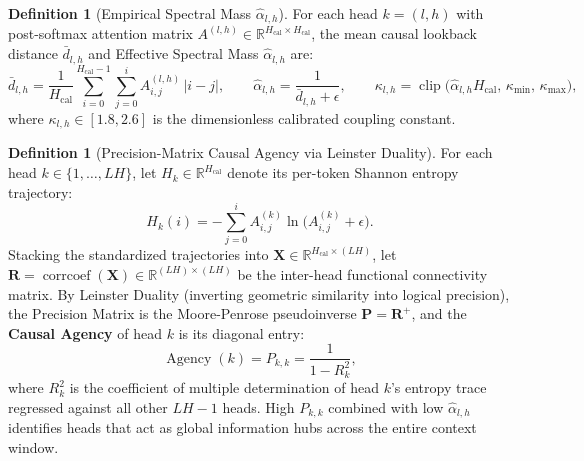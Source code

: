 \documentclass[11pt,letterpaper]{article}
\theoremstyle{definition}
\newtheorem{definition}[theorem]{Definition}
\begin{document}
\begin{definition}[Empirical Spectral Mass $\hat{\alpha}_{l,h}$]
For each head $k = (l, h)$ with post-softmax attention matrix $A^{(l,h)} \in \mathbb{R}^{H_{\text{cal}} \times H_{\text{cal}}}$, the mean causal lookback distance $\bar{d}_{l,h}$ and Effective Spectral Mass $\hat{\alpha}_{l,h}$ are:
\begin{equation}
    \bar{d}_{l,h} = \frac{1}{H_{\text{cal}}} \sum_{i=0}^{H_{\text{cal}}-1} \sum_{j=0}^{i} A^{(l,h)}_{i,j}\, |i - j|, \qquad \hat{\alpha}_{l,h} = \frac{1}{\bar{d}_{l,h} + \epsilon}, \qquad \kappa_{l,h} = \operatorname{clip}\!\big(\hat{\alpha}_{l,h} H_{\text{cal}},\, \kappa_{\min},\, \kappa_{\max}\big),
    \label{eq:eff_mass}
\end{equation}
where $\kappa_{l,h} \in [1.8, 2.6]$ is the dimensionless calibrated coupling constant.
\end{definition}

\begin{definition}[Precision-Matrix Causal Agency via Leinster Duality]
For each head $k \in \{1, \dots, L H\}$, let $H_k \in \mathbb{R}^{H_{\text{cal}}}$ denote its per-token Shannon entropy trajectory:
\begin{equation}
    H_k(i) = -\sum_{j=0}^{i} A^{(k)}_{i,j} \ln\!\big(A^{(k)}_{i,j} + \epsilon\big).
\end{equation}
Stacking the standardized trajectories into $\mathbf{X} \in \mathbb{R}^{H_{\text{cal}} \times (LH)}$, let $\mathbf{R} = \operatorname{corrcoef}(\mathbf{X}) \in \mathbb{R}^{(LH) \times (LH)}$ be the inter-head functional connectivity matrix. By Leinster Duality (inverting geometric similarity into logical precision), the Precision Matrix is the Moore-Penrose pseudoinverse $\mathbf{P} = \mathbf{R}^+$, and the \textbf{Causal Agency} of head $k$ is its diagonal entry:
\begin{equation}
    \operatorname{Agency}(k) = P_{k,k} = \frac{1}{1 - R_k^2},
    \label{eq:agency}
\end{equation}
where $R_k^2$ is the coefficient of multiple determination of head $k$'s entropy trace regressed against all other $LH - 1$ heads. High $P_{k,k}$ combined with low $\hat{\alpha}_{l,h}$ identifies heads that act as global information hubs across the entire context window.
\end{definition}
\end{document}
